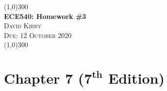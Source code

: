 \documentclass[12pt]{article}
\begin{document}
 	\begin{center}
    \line(1,0){300}\\[0.25cm]
 	\Large{\bfseries ECE540: Homework \#3}\\
 	\textsc{\large David Kirby}\\
 	\textsc{\large Due: 12 October 2020}\\
 	\line(1,0){300}\\[0.75cm]
 	\end{center}
\section*{Chapter 7 (\(\bm{7^{th}}\) Edition)}
\end{document}
